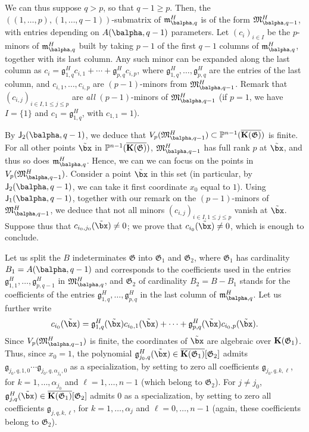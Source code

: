 \documentclass[12pt]{article}
\begin{document}
We can thus suppose $q > p$, so that $q-1 \ge p$.  Then, the
$((1,\dots,p),(1,\dots,q-1))$-submatrix of $\mathfrak{m}^H_{\balpha,q}$ is
of the form $\mathfrak{M}^H_{\balpha,q-1}$, with entries depending on
$A(\balpha,q-1)$ parameters.  Let $(c_i)_{i \in I}$ be the $p$-minors
of $\mathfrak{m}^H_{\balpha,q}$ built by taking $p-1$ of the first $q-1$
columns of $\mathfrak{m}^H_{\balpha,q}$, together with its last column.
Any such minor can be expanded along the last column as $c_i =
\mathfrak{g}^H_{1,q} c_{i,1} + \cdots + \mathfrak{g}^H_{p,q}
c_{i,p}$, where $\mathfrak{g}^H_{1,q},\dots,\mathfrak{g}^H_{p,q}$ are
the entries of the last column, and $c_{i,1},\dots,c_{i,p}$
are $(p-1)$-minors from $\mathfrak{M}^H_{\balpha,q-1}$. Remark that
$(c_{i,j})_{i \in I, 1 \le j \le p}$ are {\em all} $(p-1)$-minors
of $\mathfrak{M}^H_{\balpha,q-1}$ (if $p=1$, we have $I=\{1\}$ and
$c_1=\mathfrak{g}^H_{1,q}$, with $c_{1,1}=1$).

By $\assI_2(\balpha,q-1)$, we deduce that
$V_p(\mathfrak{M}^H_{\balpha,q-1}) \subset \P^{n-1}(\KKCbar)$ is
finite. For all other points $\tilde\bx$ in $\mathbb{P}^{n-1}(\overline{\mathbf{K}(\mathfrak{G})})$,
$\mathfrak{M}^H_{\balpha,q-1}$ has full rank $p$ at $\tilde\bx$, and
thus so does $\mathfrak{m}^H_{\balpha,q}$. Hence, we can we can focus
on the points in $V_p(\mathfrak{M}^H_{\balpha,q-1})$.  Consider a point
$\tilde\bx$ in this set (in particular, by $\assI_2(\balpha,q-1)$, we
can take it first coordinate $x_0$ equal to $1$). Using
$\assI_1(\balpha,q-1)$, together with our remark on the $(p-1)$-minors of
$\mathfrak{M}^H_{\balpha,q-1}$, we deduce that not all minors
$(c_{i,j})_{i \in I, 1 \le j \le p}$ vanish at
$\tilde\bx$. Suppose thus that $c_{i_0,j_0}(\tilde\bx) \ne 0$; we
prove that $c_{i_0}(\tilde\bx) \ne 0$, which is enough to conclude.

Let us split the $B$ indeterminates $\mathfrak{G}$ into
$\mathfrak{G}_1$ and $\mathfrak{G}_2$, where $\mathfrak{G}_1$ has
cardinality $B_1=A(\balpha,q-1)$ and corresponds to the coefficients
used in the entries
$\mathfrak{g}^H_{1,1},\dots,\mathfrak{g}^H_{p,q-1}$ in
$\mathfrak{M}^H_{\balpha,q}$, and $\mathfrak{G}_2$ of cardinality
$B_2=B-B_1$ stands for the coefficients of the entries
$\mathfrak{g}^H_{1,q},\dots,\mathfrak{g}^H_{p,q}$ in the last column
of $\mathfrak{m}^H_{\balpha,q}$.  Let us further
write $$c_{i_0}(\tilde\bx)= \mathfrak{g}^H_{1,q}(\tilde\bx)
c_{i_0,1}(\tilde\bx) + \cdots + \mathfrak{g}^H_{p,q}(\tilde\bx)
c_{i_0,p}(\tilde\bx).$$ Since $V_p(\mathfrak{M}^H_{\balpha,q-1})$ is
finite, the coordinates of $\tilde\bx$ are algebraic over
$\mathbf{K}(\mathfrak{G}_1)$.  Thus, since $x_0=1$, the polynomial
$\mathfrak{g}^H_{j_0,q}(\tilde\bx)\in
\overline{\KK(\mathfrak{G}_1)}[\mathfrak{G}_2]$ admits
$\mathfrak{g}_{j_0,q,1,0}\cdots \mathfrak{g}_{j_0,q,\alpha_{j_0},0}$ as a
specialization, by setting to zero all coefficients
$\mathfrak{g}_{j_0,q,k,\ell}$, for $k=1,\dots,\alpha_{j_0}$ and
$\ell=1,\dots,n-1$ (which belong to $\mathfrak{G}_2$).  For $j \ne
j_0$, $\mathfrak{g}^H_{j,q}(\tilde\bx)\in
\overline{\KK(\mathfrak{G}_1)}[\mathfrak{G}_2]$ admits $0$ as a
specialization, by setting to zero all coefficients
$\mathfrak{g}_{j,q,k,\ell}$, for $k=1,\dots,\alpha_j$ and
$\ell=0,\dots,n-1$ (again, these coefficients belong to $\mathfrak{G}_2$).
\end{document}
